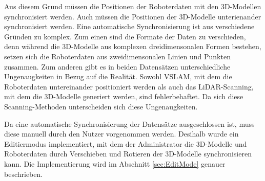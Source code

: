 Aus diesem Grund müssen die Positionen der Roboterdaten mit den 3D-Modellen synchronisiert werden. Auch müssen die Positionen der 3D-Modelle unterienander synchronisiert werden. Eine automatische Synchronisierung ist aus verschiedene Gründen zu komplex. Zum einen sind die Formate der Daten zu verschieden, denn während die 3D-Modelle aus komplexen dreidimensonalen Formen bestehen, setzen sich die Roboterdaten aus zweidimensonalen Linien und Punkten zusammen. Zum anderen gibt es in beiden Datensätzen unterschiedliche Ungenaugkeiten in Bezug auf die Realität. Sowohl \ac{VSLAM}, mit dem die Roboterdaten untereinander positioniert werden als auch das \ac{LiDAR}-Scanning, mit dem die 3D-Modelle generiert werden, sind fehlerbehaftet. Da sich diese Scanning-Methoden unterscheiden sich diese Ungenaugkeiten.

Da eine automatische Synchronisierung der Datensätze ausgeschlossen ist, muss diese manuell durch den Nutzer vorgenommen werden. Desihalb wurde ein Editiermodus implementiert, mit dem der Administrator die 3D-Modelle und Roboterdaten durch Verschieben und Rotieren der 3D-Modelle synchronisieren kann. Die Implementierung wird im Abschnitt \ref{sec:EditMode} genauer beschrieben.
